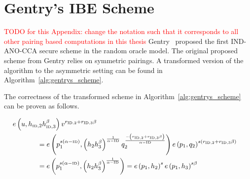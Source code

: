 \chapter{Gentry's IBE Scheme}
\label{app:gentrys_ibe_scheme}
\textcolor{red}{TODO for this Appendix: change the notation such that it corresponds to all other pairing based computations in this thesis}
Gentry~\cite{art:Gentry06} proposed the first IND-ANO-CCA secure scheme in the random oracle model. The original proposed scheme from Gentry relies on symmetric pairings. A transformed version of the algorithm to the asymmetric setting can be found in Algorithm~\ref{alg:gentrys_scheme}.

The correctness of the transformed scheme in Algorithm~\ref{alg:gentrys_scheme} can be proven as follows.

\begin{equation*}
 \begin{split}
  e \left( u, h_{\textrm{\tiny{ID}},2} h_{\textrm{\tiny{ID}},3}^{\beta} \right) v^{ r_{\textrm{\tiny{ID}},2} + r_{\textrm{\tiny{ID}},3} \beta} \\
  & \negthickspace \negthickspace \negthickspace \negthickspace \negthickspace \negthickspace \negthickspace \negthickspace \negthickspace \negthickspace \negthickspace \negthickspace \negthickspace \negthickspace \negthickspace \negthickspace\negthickspace \negthickspace \negthickspace \negthickspace \negthickspace \negthickspace \negthickspace \negthickspace \negthickspace \negthickspace \negthickspace \negthickspace \negthickspace \negthickspace \negthickspace = e \left( p_1^{s\left( \alpha - \textrm{\tiny{ID}} \right)}, \left( h_{2}h_{3}^{\beta} \right)^{\frac{1}{\alpha - \textrm{\tiny{ID}}}} q_2^{\frac{- \left( r_{\textrm{\tiny{ID}},2} + r_{\textrm{\tiny{ID}},3} \beta \right)}{\alpha - \textrm{\tiny{ID}}}} \right) e \left( p_1, q_2 \right)^{s \left( r_{\textrm{\tiny{ID}},2} + r_{\textrm{\tiny{ID}},3} \beta \right)} \\
 & \negthickspace \negthickspace \negthickspace \negthickspace \negthickspace \negthickspace \negthickspace \negthickspace \negthickspace \negthickspace \negthickspace \negthickspace \negthickspace \negthickspace \negthickspace \negthickspace \negthickspace \negthickspace \negthickspace \negthickspace \negthickspace \negthickspace \negthickspace \negthickspace \negthickspace \negthickspace \negthickspace \negthickspace \negthickspace \negthickspace \negthickspace = e \left( p_1^{s\left( \alpha - \textrm{\tiny{ID}} \right)}, \left( h_{2}h_{3}^{\beta} \right)^{\frac{1}{\alpha - \textrm{\tiny{ID}}}} \right) = e \left( p_1, h_2 \right)^s e \left( p_1, h_3\right)^{s \beta}
 \end{split}
\end{equation*}


